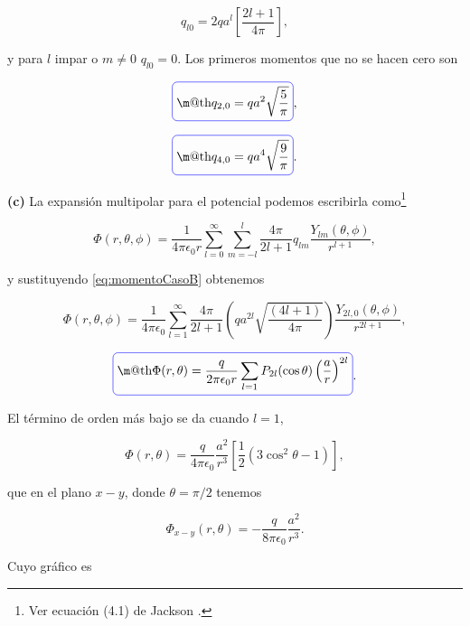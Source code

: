 \documentclass[a4paper,11pt]{article}
\makeatletter
\numberwithin{equation}{section}
\newcommand*{\boxcolor}{blue}
\renewcommand{\boxed}[1]{\textcolor{\boxcolor}{%
\tikz[baseline={([yshift=-1ex]current bounding box.center)}] \node [rectangle, minimum width=1ex,rounded corners,draw] {\normalcolor\m@th$\displaystyle#1$};}}
\makeatother
\begin{document}
\begin{equation}
 q_{l0} = 2qa^l\left[\frac{2l+1}{4\pi} \right],
 \label{eq:momentoCasoB}
\end{equation}

y para $l$ impar o $m \neq 0$ $q_{l0} = 0$. Los primeros momentos que 
no se hacen cero son 

\begin{equation}
 \boxed{q_{2,0} = qa^2\sqrt{\frac{5}{\pi}}},
\end{equation}

\begin{equation}
 \boxed{q_{4,0} = qa^4\sqrt{\frac{9}{\pi}}}.
\end{equation}

\textbf{(c)} La expansión multipolar para el potencial podemos escribirla como\footnote{Ver 
ecuación (4.1) de Jackson \cite{jackson}.} 

\begin{equation}
 \Phi(r,\theta,\phi) = \frac{1}{4\pi\epsilon_0 r}\sum_{l=0}^\infty 
 \sum_{m=-l}^l \frac{4\pi}{2l+1} 
 q_{lm} \frac{Y_{lm}(\theta,\phi)}{r^{l+1}},
\end{equation}

y sustituyendo \eqref{eq:momentoCasoB} obtenemos 

\begin{equation}
 \Phi(r,\theta,\phi) = \frac{1}{4\pi\epsilon_0}\sum_{l=1}^\infty \frac{4\pi}{2l+1}  
 \left(qa^{2l}\sqrt{\frac{(4l+1)}{4\pi}} \right)\frac{Y_{2l,0}(\theta,\phi)}{r^{2l+1}},
\end{equation}

\begin{equation}
 \boxed{\Phi(r,\theta) = \frac{q}{2\pi\epsilon_0 r}\sum_{l=1}P_{2l}(\cos{\theta})
 \left(\frac{a}{r}\right)^{2l}}.
\end{equation}

El término de orden más bajo se da cuando $l=1$, 

\begin{equation}
 \Phi(r,\theta) = \frac{q}{4\pi\epsilon_0}\frac{a^2}{r^3}\left[ 
 \frac{1}{2}(3\cos^2{\theta} - 1)\right],
\end{equation}

que en el plano $x-y$, donde $\theta = \pi/2$ tenemos 

\begin{equation}
 \Phi_{x-y}(r,\theta) = - \frac{q}{8\pi\epsilon_0}\frac{a^2}{r^3}.
\end{equation}

Cuyo gráfico es 
\end{document}
